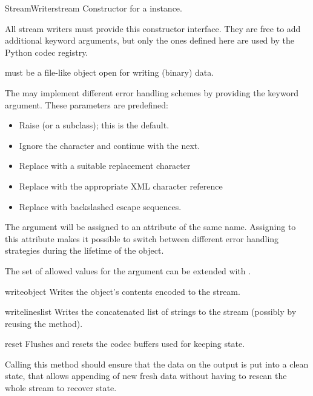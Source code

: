\begin{classdesc}{StreamWriter}{stream}
  Constructor for a  instance. 

  All stream writers must provide this constructor interface. They are
  free to add additional keyword arguments, but only the ones defined
  here are used by the Python codec registry.

   must be a file-like object open for writing (binary)
  data.

  The  may implement different error handling
  schemes by providing the  keyword argument. These
  parameters are predefined:

  \begin{itemize}
    \item {} Raise  (or a subclass);
                          this is the default.
    \item {} Ignore the character and continue with the next.
    \item {} Replace with a suitable replacement character
    \item {} Replace with the appropriate XML
                     character reference
    \item {} Replace with backslashed escape sequences.
  \end{itemize}

  The  argument will be assigned to an attribute of the
  same name. Assigning to this attribute makes it possible to switch
  between different error handling strategies during the lifetime
  of the  object.

  The set of allowed values for the  argument can
  be extended with .
\end{classdesc}

\begin{methoddesc}{write}{object}
  Writes the object's contents encoded to the stream.
\end{methoddesc}

\begin{methoddesc}{writelines}{list}
  Writes the concatenated list of strings to the stream (possibly by
  reusing the  method).
\end{methoddesc}

\begin{methoddesc}{reset}{}
  Flushes and resets the codec buffers used for keeping state.

  Calling this method should ensure that the data on the output is put
  into a clean state, that allows appending of new fresh data without
  having to rescan the whole stream to recover state.
\end{methoddesc}

